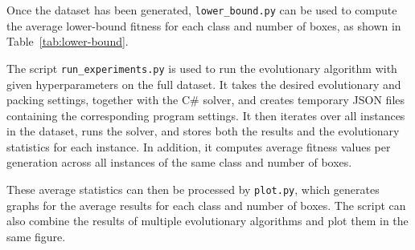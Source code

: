 Once the dataset has been generated, \texttt{lower\_bound.py} can be used to compute the average lower-bound fitness for each class and number of boxes, as shown in Table~\ref{tab:lower-bound}.

The script \texttt{run\_experiments.py} is used to run the evolutionary algorithm with given hyperparameters on the full dataset. 
It takes the desired evolutionary and packing settings, together with the C\# solver, and creates temporary JSON files containing the corresponding program settings. 
It then iterates over all instances in the dataset, runs the solver, and stores both the results and the evolutionary statistics for each instance. 
In addition, it computes average fitness values per generation across all instances of the same class and number of boxes.

These average statistics can then be processed by \texttt{plot.py}, which generates graphs for the average results for each class and number of boxes. 
The script can also combine the results of multiple evolutionary algorithms and plot them in the same figure.